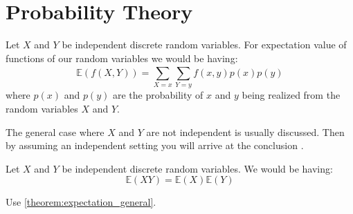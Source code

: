 \section{Probability Theory}

\begin{Thm}\label{theorem:expectation_general}
    Let $X$ and $Y$ be independent discrete random variables. For expectation value of functions of our random variables we would be having:
	\begin{equation*}
		\mathbb{E}(f(X,Y)) = \sum_{X=x}^{}\sum_{Y=y}^{}f(x,y)p(x)p(y)
	\end{equation*}
    where $p(x)$ and $p(y)$ are the probability of $x$ and $y$ being realized from the random variables $X$ and $Y$.
\end{Thm}
\begin{Proof}
    The general case where $X$ and $Y$ are not independent is usually discussed. Then by assuming an independent setting 
    you will arrive at the conclusion \cite{DasGupta2010}\cite{DasGupta2011}.
\end{Proof}
\begin{Cor}\label{theorem:expectation_multiplication}
	Let $X$ and $Y$ be independent discrete random variables. We would be having:
	\begin{equation*}
		\mathbb{E}(XY) = \mathbb{E}(X)\mathbb{E}(Y)
	\end{equation*}
\end{Cor}
\begin{Proof}
Use \cref{theorem:expectation_general}.
\end{Proof}






